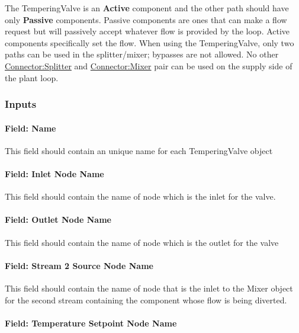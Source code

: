 The TemperingValve is an \textbf{Active} component and the other path should have only \textbf{Passive} components. Passive components are ones that can make a flow request but will passively accept whatever flow is provided by the loop. Active components specifically set the flow. When using the TemperingValve, only two paths can be used in the splitter/mixer; bypasses are not allowed. No other \hyperref[connectorsplitter]{Connector:Splitter} and \hyperref[connectormixer]{Connector:Mixer} pair can be used on the supply side of the plant loop.

\subsubsection{Inputs}\label{inputs-2-029}

\paragraph{Field: Name}\label{field-name-2-028}

This field should contain an unique name for each TemperingValve object

\paragraph{Field: Inlet Node Name}\label{field-inlet-node-name-003}

This field should contain the name of node which is the inlet for the valve.

\paragraph{Field: Outlet Node Name}\label{field-outlet-node-name-004}

This field should contain the name of node which is the outlet for the valve

\paragraph{Field: Stream 2 Source Node Name}\label{field-stream-2-source-node-name}

This field should contain the name of node that is the inlet to the Mixer object for the second stream containing the component whose flow is being diverted.

\paragraph{Field: Temperature Setpoint Node Name}\label{field-temperature-setpoint-node-name-000}

